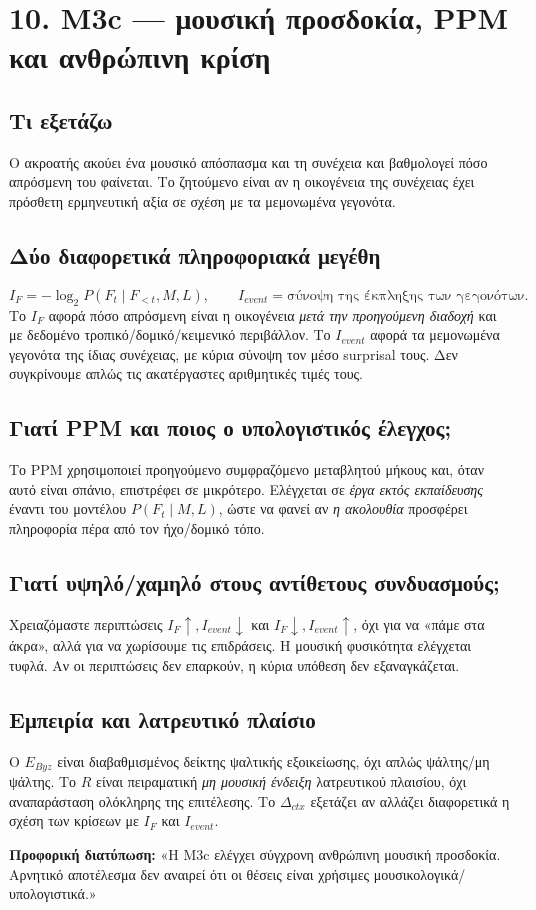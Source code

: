 \documentclass[9pt,a4paper]{extarticle}
\newcommand{\say}[1]{\begin{keybox}\textbf{Προφορική διατύπωση:} #1\end{keybox}}
\begin{document}
\section*{10. M3c — μουσική προσδοκία, PPM και ανθρώπινη κρίση}
\subsection*{Τι εξετάζω}
Ο ακροατής ακούει ένα μουσικό απόσπασμα και τη συνέχεια και βαθμολογεί πόσο απρόσμενη του φαίνεται. Το ζητούμενο είναι αν η οικογένεια της συνέχειας έχει πρόσθετη ερμηνευτική αξία σε σχέση με τα μεμονωμένα γεγονότα.
\subsection*{Δύο διαφορετικά πληροφοριακά μεγέθη}
\[
I_F=-\log_2 P(F_t\mid F_{<t},M,L),\qquad I_{event}=\text{σύνοψη της έκπληξης των γεγονότων}.
\]
Το \(I_F\) αφορά πόσο απρόσμενη είναι η οικογένεια \emph{μετά την προηγούμενη διαδοχή} και με δεδομένο τροπικό/δομικό/κειμενικό περιβάλλον. Το \(I_{event}\) αφορά τα μεμονωμένα γεγονότα της ίδιας συνέχειας, με κύρια σύνοψη τον μέσο surprisal τους. Δεν συγκρίνουμε απλώς τις ακατέργαστες αριθμητικές τιμές τους.
\subsection*{Γιατί PPM και ποιος ο υπολογιστικός έλεγχος;}
Το PPM χρησιμοποιεί προηγούμενο συμφραζόμενο μεταβλητού μήκους και, όταν αυτό είναι σπάνιο, επιστρέφει σε μικρότερο. Ελέγχεται σε \emph{έργα εκτός εκπαίδευσης} έναντι του μοντέλου \(P(F_t\mid M,L)\), ώστε να φανεί αν \emph{η ακολουθία} προσφέρει πληροφορία πέρα από τον ήχο/δομικό τόπο.
\subsection*{Γιατί υψηλό/χαμηλό στους αντίθετους συνδυασμούς;}
Χρειαζόμαστε περιπτώσεις \(I_F\uparrow,I_{event}\downarrow\) και \(I_F\downarrow,I_{event}\uparrow\), όχι για να «πάμε στα άκρα», αλλά για να χωρίσουμε τις επιδράσεις. Η μουσική φυσικότητα ελέγχεται τυφλά. Αν οι περιπτώσεις δεν επαρκούν, η κύρια υπόθεση δεν εξαναγκάζεται.
\subsection*{Εμπειρία και λατρευτικό πλαίσιο}
Ο \(E_{Byz}\) είναι διαβαθμισμένος δείκτης ψαλτικής εξοικείωσης, όχι απλώς ψάλτης/μη ψάλτης. Το \(R\) είναι πειραματική \emph{μη μουσική ένδειξη} λατρευτικού πλαισίου, όχι αναπαράσταση ολόκληρης της επιτέλεσης. Το \(\Delta_{ctx}\) εξετάζει αν αλλάζει διαφορετικά η σχέση των κρίσεων με \(I_F\) και \(I_{event}\).
\say{«Η M3c ελέγχει σύγχρονη ανθρώπινη μουσική προσδοκία. Αρνητικό αποτέλεσμα δεν αναιρεί ότι οι θέσεις είναι χρήσιμες μουσικολογικά/υπολογιστικά.»}
\newpage
\end{document}

